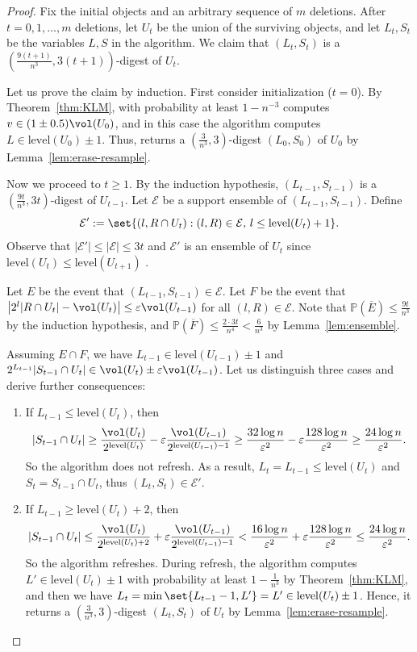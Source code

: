\documentclass[a4paper, 11pt]{article}
\newcommand{\level}{\mathrm{level}}
\newcommand{\eps}{\varepsilon}
\renewcommand{\Pr}{\mathbb{P}}
\newcommand{\class}[1]{\mathcal{#1}}
\begin{document}
\begin{proof}
    Fix the initial objects and an arbitrary sequence of $m$ deletions. After $t = 0, 1, \dots, m$ deletions, let $U_t$ be the union of the surviving objects, and let $L_t,S_t$ be the variables $L,S$ in the algorithm. We claim that $(L_t,S_t)$ is a $(\frac{9(t+1)}{n^3}, 3(t+1))$-digest of $U_t$.
    
    Let us prove the claim by induction. First consider initialization ($t = 0$). By Theorem~\ref{thm:KLM}, with probability at least $1 - n^{-3}$ \KLM computes $v \in (1 \pm 0.5) \vol(U_0)$, and in this case the algorithm computes $L \in \level(U_0) \pm 1$. Thus, \resample returns a $(\frac{3}{n^3},3)$-digest $(L_0,S_0)$ of $U_0$ by Lemma~\ref{lem:erase-resample}.
    
    Now we proceed to $t \geq 1$. By the induction hypothesis, $(L_{t-1},S_{t-1})$ is a $(\frac{9t}{n^3}, 3t)$-digest of $U_{t-1}$. Let $\class{E}$ be a support ensemble of $(L_{t-1}, S_{t-1})$. Define
    \[
        \class{E}' := \set{(l,R \cap U_t) : (l,R) \in \class{E},\, l \leq \level(U_t)+1 }.
    \]
    Observe that $|\class{E}'| \leq |\class{E}| \leq 3t$ and $\class{E}'$ is an ensemble of $U_t$ since $\level(U_t) \leq \level(U_{t+1})$ .
    
    Let $E$ be the event that $(L_{t-1}, S_{t-1}) \in \class{E}$. Let $F$ be the event that $\left| 2^l |R \cap U_t| - \vol(U_t) \right| \leq \eps \vol(U_{t-1})$ for all $(l,R) \in \class{E}$. Note that $\Pr(\overline{E}) \leq \frac{9t}{n^3}$ by the induction hypothesis, and $\Pr(\overline{F}) \leq \frac{2 \cdot 3t}{n^4} < \frac{6}{n^3}$ by Lemma~\ref{lem:ensemble}.
    
    Assuming $E \cap F$, we have $L_{t-1} \in \level(U_{t-1}) \pm 1$ and $2^{L_{t-1}} |S_{t-1} \cap U_t| \in \vol(U_t)\pm\eps \vol(U_{t-1})$. Let us distinguish three cases and derive further consequences:
    \begin{enumerate}[(1)]
        \item If $L_{t-1} \leq \level(U_t)$, then
        \[
            |S_{t-1} \cap U_t|
            \geq \frac{\vol(U_t)}{2^{\level(U_t)}} - \eps \frac{\vol(U_{t-1})}{2^{\level(U_{t-1})-1}}
            \geq \frac{32 \log n}{\eps^2} - \eps \frac{128 \log n}{\eps^2}
            \geq \frac{24 \log n}{\eps^2}.
        \]
        So the algorithm does not refresh. As a result, $L_t = L_{t-1} \leq \level(U_t)$ and $S_t = S_{t-1} \cap U_t$, thus $(L_t, S_t) \in \class{E}'$.

        \item If $L_{t-1} \geq \level(U_t) + 2$, then
        \[
            |S_{t-1} \cap U_t|
            \leq \frac{\vol(U_t)}{2^{\level(U_t)+2}} + \eps \frac{\vol(U_{t-1})}{2^{\level(U_{t-1})-1}}
            < \frac{16 \log n}{\eps^2} + \eps \frac{128 \log n}{\eps^2}
            \leq \frac{24 \log n}{\eps^2}.
        \]
        So the algorithm refreshes. During refresh, the algorithm computes $L' \in \level(U_t) \pm 1$ with probability at least $1 - \tfrac 1{n^3}$ by Theorem~\ref{thm:KLM}, and then we have $L_t = \min \set{L_{t-1}-1, L'} = L' \in \level(U_t) \pm 1$. Hence, it returns a $(\frac{3}{n^3}, 3)$-digest $(L_t, S_t)$ of $U_t$ by Lemma~\ref{lem:erase-resample}.
        

\end{enumerate}
\end{proof}
\end{document}
